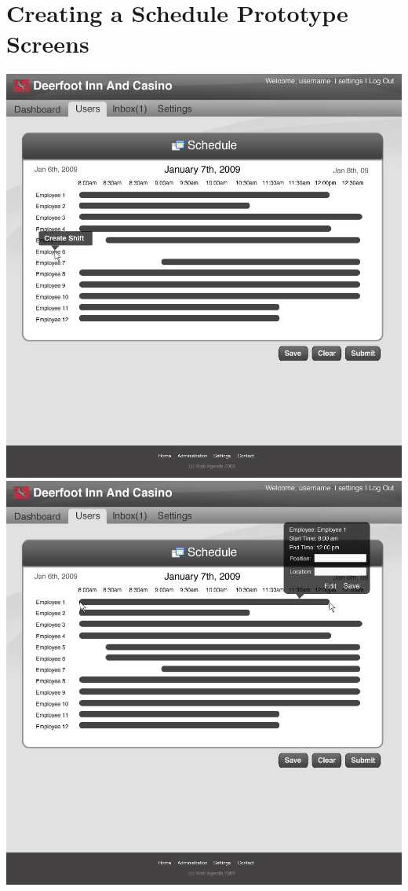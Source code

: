 \documentclass[letterpaper,12pt]{report}
\begin{document}
\section{Creating a Schedule Prototype Screens}
\begin{landscape}
\begin{center}
 \includegraphics[scale=0.3]{prototypes/createScheduleClickEmp.jpg}
 \includegraphics[scale=0.3]{prototypes/createSchedDrag.jpg}
\end{center}


\end{landscape}
\end{document}
